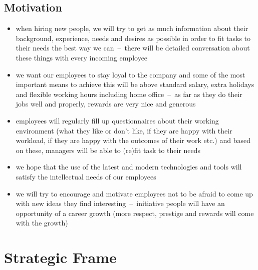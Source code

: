 \documentclass[11pt,a4paper]{article}
\begin{document}
    \subsection{Motivation}
    \begin{itemize}
        \item when hiring new people, we will try to get as much information about their background, experience, needs and desires as possible in order to fit tasks to their needs the best way we can~--~there will be detailed conversation about these things with every incoming employee

        \item we want our employees to stay loyal to the company and some of the most important means to achieve this will be above standard salary, extra holidays and flexible working hours including home office~--~as far as they do their jobs well and properly, rewards are very nice and generous

        \item employees will regularly fill up questionnaires about their working environment (what they like or don’t like, if they are happy with their workload, if they are happy with the outcomes of their work etc.) and based on these, managers will be able to (re)fit task to their needs

        \item we hope that the use of the latest and modern technologies and tools will satisfy the intellectual needs of our employees

        \item we will try to encourage and motivate employees not to be afraid to come up with new ideas they find interesting~--~initiative people will have an opportunity of a career growth (more respect, prestige and rewards will come with the growth)
    \end{itemize}

\newpage

\section{Strategic Frame}
\end{document}
